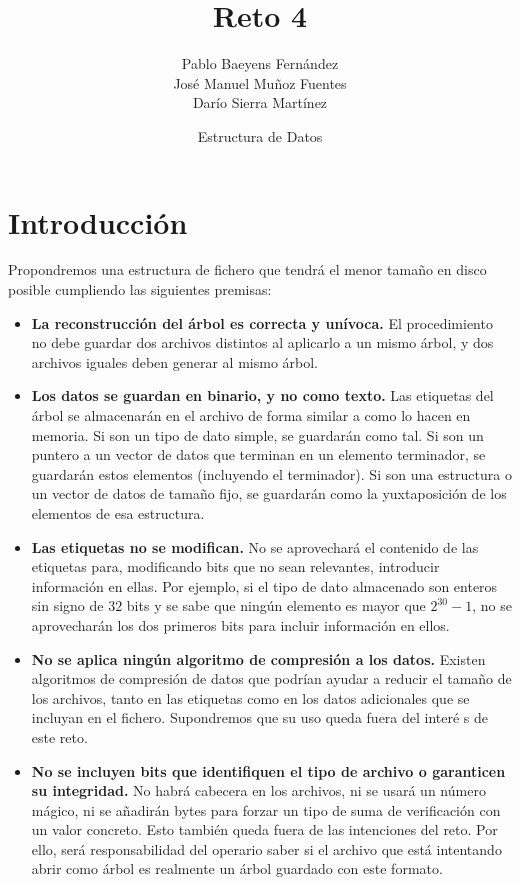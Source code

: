 \documentclass{article}
\title{Reto 4}
\date{Estructura de Datos}
\author{Pablo Baeyens Fernández\\José Manuel Muñoz Fuentes\\Darío Sierra Martínez}
\begin{document}
\maketitle

\section{Introducción}


Propondremos una estructura de fichero que tendrá el menor tamaño en disco
posible cumpliendo las siguientes premisas:
\begin{itemize}
	\item \textbf{La reconstrucción del árbol es correcta y unívoca.}
  El procedimiento no debe guardar dos archivos distintos al aplicarlo a un mismo
  árbol, y dos archivos iguales deben generar al mismo árbol.
	\item \textbf{Los datos se guardan en binario, y no como texto.} Las etiquetas
  del árbol se almacenarán en el archivo de forma similar a como lo hacen en
  memoria. Si son un tipo de dato simple, se guardarán como tal. Si son un puntero
  a un vector de datos que terminan en un elemento terminador, se guardarán
  estos elementos (incluyendo el terminador). Si son una estructura o un vector
  de datos de tamaño fijo, se guardarán como la yuxtaposición de los elementos
  de esa estructura.
	\item \textbf{Las etiquetas no se modifican.} No se aprovechará el contenido
  de las etiquetas para, modificando bits que no sean relevantes, introducir
  información en ellas. Por ejemplo, si el tipo de dato almacenado son enteros
  sin signo de $32$ bits y se sabe que ningún elemento es mayor que $2^{30}-1$,
  no se aprovecharán los dos primeros bits para incluir información en ellos.
	\item \textbf{No se aplica ningún algoritmo de compresión a los datos.}
  Existen algoritmos de compresión de datos que podrían ayudar a reducir el
  tamaño de los archivos, tanto en las etiquetas como en los datos adicionales
  que se incluyan en el fichero. Supondremos que su uso queda fuera del interé
  s de este reto.
	\item \textbf{No se incluyen bits que identifiquen el tipo de archivo
  o garanticen su integridad.} No habrá cabecera en los archivos, ni se usará un
  número mágico, ni se añadirán bytes para forzar un tipo de suma de verificación
  con un valor concreto. Esto también queda fuera de las intenciones del reto.
  Por ello, será responsabilidad del operario saber si el archivo que está
  intentando abrir como árbol es realmente un árbol guardado con este formato.
\end{itemize}
\end{document}
